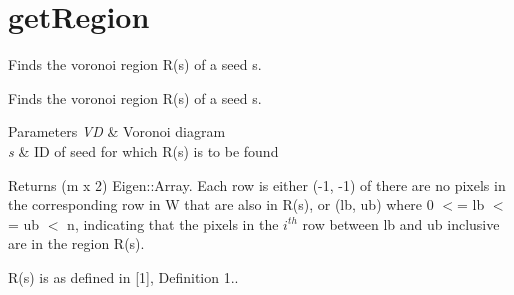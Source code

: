 \hypertarget{group__getRegion}{}\section{get\+Region}
\label{group__getRegion}


Finds the voronoi region R(s) of a seed s.  


Finds the voronoi region R(s) of a seed s. 


\begin{DoxyParams}{Parameters}
{\em VD} & Voronoi diagram \\
\hline
{\em s} & ID of seed for which R(s) is to be found \\
\hline
\end{DoxyParams}
\begin{DoxyReturn}{Returns}
(m x 2) Eigen\+::\+Array. Each row is either (-\/1, -\/1) of there are no pixels in the corresponding row in W that are also in R(s), or (lb, ub) where 0 $<$= lb $<$= ub $<$ n, indicating that the pixels in the $i^{th}$ row between lb and ub inclusive are in the region R(s).
\end{DoxyReturn}
R(s) is as defined in \mbox{[}1\mbox{]}, Definition 1.. 